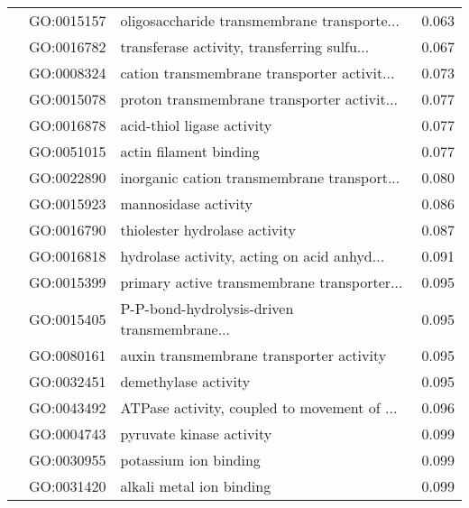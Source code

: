 \begin{longtable}{lllr}
   & GO:0015157 &  oligosaccharide transmembrane transporte... &         0.063 \\
   & GO:0016782 &  transferase activity, transferring sulfu... &         0.067 \\
   & GO:0008324 &  cation transmembrane transporter activit... &         0.073 \\
   & GO:0015078 &  proton transmembrane transporter activit... &         0.077 \\
   & GO:0016878 &                   acid-thiol ligase activity &         0.077 \\
   & GO:0051015 &                       actin filament binding &         0.077 \\
   & GO:0022890 &  inorganic cation transmembrane transport... &         0.080 \\
   & GO:0015923 &                         mannosidase activity &         0.086 \\
   & GO:0016790 &                thiolester hydrolase activity &         0.087 \\
   & GO:0016818 &  hydrolase activity, acting on acid anhyd... &         0.091 \\
   & GO:0015399 &  primary active transmembrane transporter... &         0.095 \\
   & GO:0015405 &  P-P-bond-hydrolysis-driven transmembrane... &         0.095 \\
   & GO:0080161 &     auxin transmembrane transporter activity &         0.095 \\
   & GO:0032451 &                         demethylase activity &         0.095 \\
   & GO:0043492 &  ATPase activity, coupled to movement of ... &         0.096 \\
   & GO:0004743 &                     pyruvate kinase activity &         0.099 \\
   & GO:0030955 &                        potassium ion binding &         0.099 \\
   & GO:0031420 &                     alkali metal ion binding &         0.099 \\
\end{longtable}
